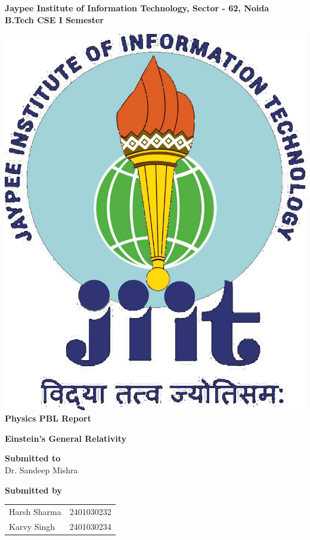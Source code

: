 \documentclass[12pt,a4paper]{article}
\begin{document}
\begin{titlepage}
    \centering
    
    \Huge
    \textbf{Jaypee Institute of Information Technology, Sector - 62, Noida } \\
    \vspace{0.5cm}
    \Large
    \textbf{B.Tech CSE I Semester}\\
    \vspace{1cm}
    \vspace*{\fill}
    
    \includegraphics[scale=0.2]{jiit_logo}\\
    
    \vspace{1.5cm}
    \Huge
    \textbf{Physics PBL Report}\\
    \Large
    
    \textbf{Einstein's General Relativity}\\
    \vspace{1cm}

    \Large
    \textbf{Submitted to}\\
    Dr. Sandeep Mishra
    \vspace{1cm}

    \textbf{Submitted by}
    \vspace{0.5cm}

    \begin{tabular}{ll}
        Harsh Sharma & 2401030232 \\
        Karvy Singh & 2401030234 \\
    \end{tabular}

    \vspace*{\fill}
    \normalsize
\end{titlepage}
\end{document}
